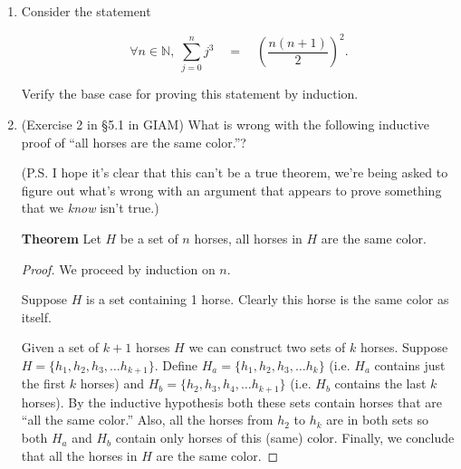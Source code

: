 \documentclass{amsart}
\begin{document}
\begin{enumerate}
\begin{enumerate}
\item Write out the ways to use 3's and 5's to get all the possible postages between 10 and 20. 

\vspace{1in}

\item What would the base case in an inductive proof of this statement be? 

\vspace{1in}

\end{enumerate}

\item Consider the statement

\[ \forall n \in {\mathbb N}, \; \sum_{j=0}^n j^3 \quad = \quad \left(\frac{n(n+1)}{2}\right)^2. \]

Verify the base case for proving this statement by induction.

\vfill

\newpage

\item (Exercise 2 in \S 5.1 in GIAM) What is wrong with the following inductive proof of
``all horses are the same color.''?  

(P.S. I hope it's clear that this can't be a true theorem, we're being 
asked to figure out what's wrong with an argument that appears to prove something that we {\em know} isn't true.)

{\bf Theorem} Let $H$ be a set of $n$ horses, all horses in $H$ 
are the same color.

\begin{proof}
We proceed by induction on $n$.

 Suppose $H$ is a set containing 1 horse.  Clearly
this horse is the same color as itself.

 Given a set of $k+1$ horses $H$ we can 
construct two sets of $k$ horses.  Suppose $H = \{ h_1, h_2, h_3, \ldots h_{k+1} \}$.  Define $H_a = \{ h_1, h_2, h_3, \ldots h_{k} \}$ (i.e. $H_a$ contains
just the first $k$ horses) and $H_b = \{ h_2, h_3, h_4, \ldots h_{k+1} \}$ 
(i.e. $H_b$ contains the last $k$ horses).  By the inductive hypothesis
both these sets contain horses that are ``all the same color.''  Also,
all the horses from $h_2$ to $h_k$ are in both sets so both $H_a$ and
$H_b$ contain only horses of this (same) color.  Finally, we conclude that
all the horses in $H$ are the same color.


\end{proof}
\end{enumerate}
\end{document}
